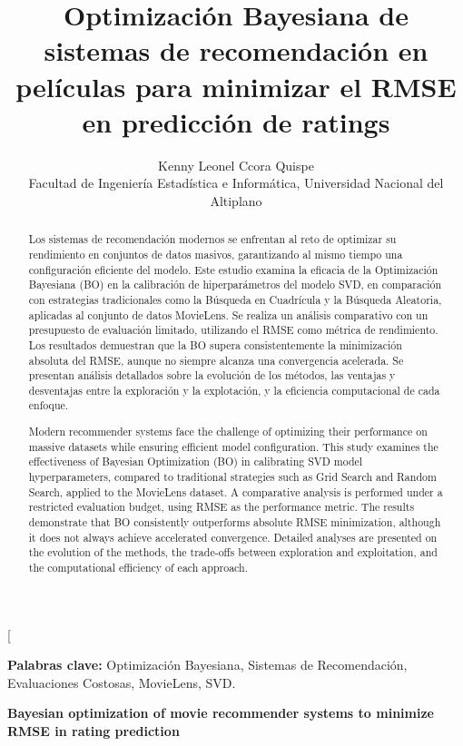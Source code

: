 \documentclass[twocolumn,10pt]{article}
\title{\textbf{Optimización Bayesiana de sistemas de recomendación en películas para minimizar el RMSE en predicción de ratings} }
\author{\normalsize Kenny Leonel Ccora Quispe\\
\normalsize Facultad de Ingeniería Estadística e Informática, Universidad Nacional del Altiplano}
\date{}
\begin{document}
\twocolumn[
\maketitle

\begin{abstract}
Los sistemas de recomendación modernos se enfrentan al reto de optimizar su rendimiento en conjuntos de datos masivos, garantizando al mismo tiempo una configuración eficiente del modelo. Este estudio examina la eficacia de la Optimización Bayesiana (BO) en la calibración de hiperparámetros del modelo SVD, en comparación con estrategias tradicionales como la Búsqueda en Cuadrícula y la Búsqueda Aleatoria, aplicadas al conjunto de datos MovieLens. Se realiza un análisis comparativo con un presupuesto de evaluación limitado, utilizando el RMSE como métrica de rendimiento. Los resultados demuestran que la BO supera consistentemente la minimización absoluta del RMSE, aunque no siempre alcanza una convergencia acelerada. Se presentan análisis detallados sobre la evolución de los métodos, las ventajas y desventajas entre la exploración y la explotación, y la eficiencia computacional de cada enfoque.
\end{abstract}

\noindent\textbf{Palabras clave:} Optimización Bayesiana, Sistemas de Recomendación, Evaluaciones Costosas, MovieLens, SVD.
\vspace{2em}

\noindent\textbf{Bayesian optimization of movie recommender systems to minimize RMSE in rating prediction}

\vspace{1em}
\renewcommand{\abstractname}{Abstract}
\begin{abstract}
Modern recommender systems face the challenge of optimizing their performance on massive datasets while ensuring efficient model configuration. This study examines the effectiveness of Bayesian Optimization (BO) in calibrating SVD model hyperparameters, compared to traditional strategies such as Grid Search and Random Search, applied to the MovieLens dataset. A comparative analysis is performed under a restricted evaluation budget, using RMSE as the performance metric. The results demonstrate that BO consistently outperforms absolute RMSE minimization, although it does not always achieve accelerated convergence. Detailed analyses are presented on the evolution of the methods, the trade-offs between exploration and exploitation, and the computational efficiency of each approach.
\end{abstract}
\end{document}
